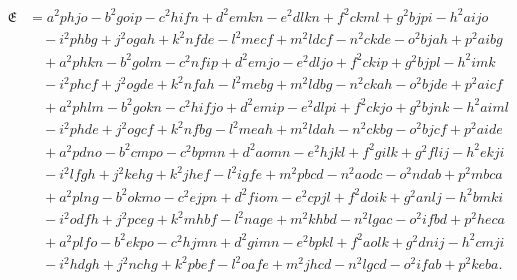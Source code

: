 \documentclass[11pt]{article}
\newcommand{\fE}{\mathfrak{E}}
\begin{document}
\[
\begin{aligned}
\fE &= a^2 phjo - b^2 goip - c^2 hifn + d^2 emkn - e^2 dlkn + f^2 ckml + g^2 bjpi - h^2 aijo\\
&\quad - i^2 phbg + j^2 ogah + k^2 nfde - l^2 mecf + m^2 ldcf - n^2 ckde - o^2 bjah + p^2 aibg\\
&\quad + a^2 phkn - b^2 golm - c^2 nfip + d^2 emjo - e^2 dljo + f^2 ckip + g^2 bjpl - h^2 imk\\
&\quad - i^2 phcf + j^2 ogde + k^2 nfah - l^2 mebg + m^2 ldbg - n^2 ckah - o^2 bjde + p^2 aicf\\
&\quad + a^2 phlm - b^2 gokn - c^2 hifjo + d^2 emip - e^2 dlpi + f^2 ckjo + g^2 bjnk - h^2 aiml\\
&\quad - i^2 phde + j^2 ogcf + k^2 nfbg - l^2 meah + m^2 ldah - n^2 ckbg - o^2 bjcf + p^2 aide\\
&\quad + a^2 pdno - b^2 cmpo - c^2 bpmn + d^2 aomn - e^2 hjkl + f^2 gilk + g^2 flij - h^2 ekji\\
&\quad - i^2 lfgh + j^2 kehg + k^2 jhef - l^2 igfe + m^2 pbcd - n^2 aodc - o^2 ndab + p^2 mbca\\
&\quad + a^2 plng - b^2 okmo - c^2 ejpn + d^2 fiom - e^2 cpjl + f^2 doik + g^2 anlj - h^2 bmki\\
&\quad - i^2 odfh + j^2 pceg + k^2 mhbf - l^2 nage + m^2 khbd - n^2 lgac - o^2 ifbd + p^2 heca\\
&\quad + a^2 plfo - b^2 ekpo - c^2 hjmn + d^2 gimn - e^2 bpkl + f^2 aolk + g^2 dnij - h^2 cmji\\
&\quad - i^2 hdgh + j^2 nchg + k^2 pbef - l^2 oafe + m^2 jhcd - n^2 lgcd - o^2 ifab + p^2 keba.
\end{aligned}
\]
\end{document}
